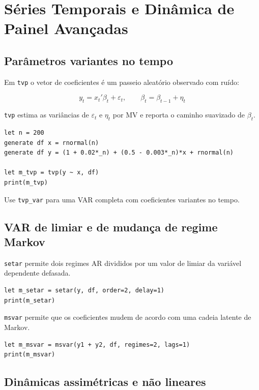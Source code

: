 \chapter{Séries Temporais e Dinâmica de Painel Avançadas}

\section{Parâmetros variantes no tempo}

Em \texttt{tvp} o vetor de coeficientes é um passeio aleatório observado com
ruído:

\[
y_t = x_t'\beta_t + \varepsilon_t, \qquad
\beta_t = \beta_{t-1} + \eta_t
\]

\texttt{tvp} estima as variâncias de $\varepsilon_t$ e $\eta_t$ por MV e
reporta o caminho suavizado de $\beta_t$.

\begin{lstlisting}[caption={Regressão com parâmetros variantes no tempo}]
let n = 200
generate df x = rnormal(n)
generate df y = (1 + 0.02*_n) + (0.5 - 0.003*_n)*x + rnormal(n)

let m_tvp = tvp(y ~ x, df)
print(m_tvp)
\end{lstlisting}

Use \texttt{tvp\_var} para uma VAR completa com coeficientes variantes no tempo.

\section{VAR de limiar e de mudança de regime Markov}

\texttt{setar} permite dois regimes AR divididos por um valor de limiar da
variável dependente defasada.

\begin{lstlisting}[caption={SETAR}]
let m_setar = setar(y, df, order=2, delay=1)
print(m_setar)
\end{lstlisting}

\texttt{msvar} permite que os coeficientes mudem de acordo com uma cadeia
latente de Markov.

\begin{lstlisting}[caption={VAR com mudança de regime Markov}]
let m_msvar = msvar(y1 + y2, df, regimes=2, lags=1)
print(m_msvar)
\end{lstlisting}

\section{Dinâmicas assimétricas e não lineares}

